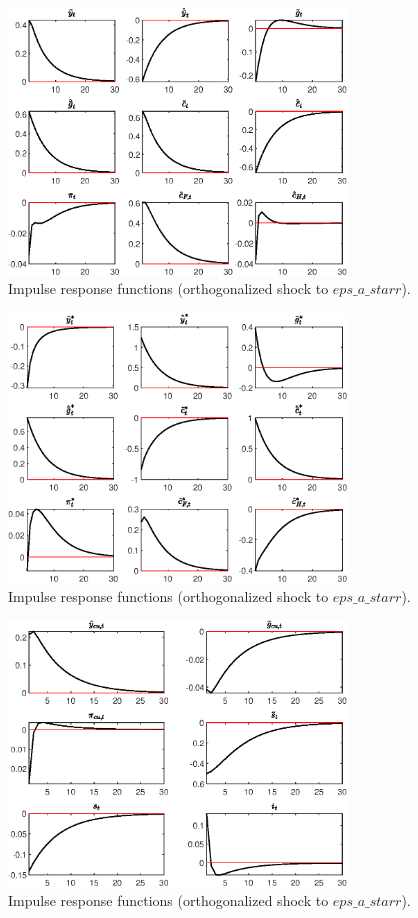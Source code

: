  
\begin{figure}[H]
\centering 
\includegraphics[width=0.80\textwidth]{MODEL_MAIN/graphs/MODEL_MAIN_IRF_eps_a_starr1}
\caption{Impulse response functions (orthogonalized shock to $eps\_a\_starr$).}\label{Fig:IRF:eps_a_starr:1}
\end{figure}
 
\begin{figure}[H]
\centering 
\includegraphics[width=0.80\textwidth]{MODEL_MAIN/graphs/MODEL_MAIN_IRF_eps_a_starr2}
\caption{Impulse response functions (orthogonalized shock to $eps\_a\_starr$).}\label{Fig:IRF:eps_a_starr:2}
\end{figure}
 
\begin{figure}[H]
\centering 
\includegraphics[width=0.80\textwidth]{MODEL_MAIN/graphs/MODEL_MAIN_IRF_eps_a_starr3}
\caption{Impulse response functions (orthogonalized shock to $eps\_a\_starr$).}\label{Fig:IRF:eps_a_starr:3}
\end{figure}
 
 
